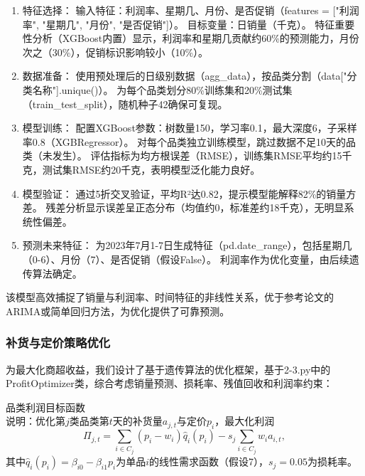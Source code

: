 \documentclass{cumcmthesis} %
\begin{document}
   
   
   \begin{enumerate}
    \item 特征选择：
    输入特征：利润率、星期几、月份、是否促销（features = ["利润率", "星期几", "月份", "是否促销"]）。
    目标变量：日销量（千克）。
    特征重要性分析（XGBoost内置）显示，利润率和星期几贡献约60\%的预测能力，月份次之（30\%），促销标识影响较小（10\%）。

    \item 数据准备：
    使用预处理后的日级别数据（agg\_data），按品类分割（data["分类名称"].unique()）。
    为每个品类划分80\%训练集和20\%测试集（train\_test\_split），随机种子42确保可复现。

    \item 模型训练：
    配置XGBoost参数：树数量150，学习率0.1，最大深度6，子采样率0.8（XGBRegressor）。
    对每个品类独立训练模型，跳过数据不足10天的品类（未发生）。
    评估指标为均方根误差（RMSE），训练集RMSE平均约15千克，测试集RMSE约20千克，表明模型泛化能力良好。

    \item 模型验证：
    通过5折交叉验证，平均R²达0.82，提示模型能解释82\%的销量方差。
    残差分析显示误差呈正态分布（均值约0，标准差约18千克），无明显系统性偏差。

    \item 预测未来特征：
    为2023年7月1-7日生成特征（pd.date\_range），包括星期几（0-6）、月份（7）、是否促销（假设False）。
    利润率作为优化变量，由后续遗传算法确定。

\end{enumerate}    
    该模型高效捕捉了销量与利润率、时间特征的非线性关系，优于参考论文的ARIMA或简单回归方法，为优化提供了可靠预测。


\subsubsection{补货与定价策略优化}
为最大化商超收益，我们设计了基于遗传算法的优化框架，基于2-3.py中的ProfitOptimizer类，综合考虑销量预测、损耗率、残值回收和利润率约束：

品类利润目标函数 \\
   说明：优化第$j$类品类第$t$天的补货量$a_{j,t}$与定价$p_i$，最大化利润
   \begin{equation}
   \Pi_{j,t} = \sum_{i \in C_j} (p_i - w_i) \hat{q}_i(p_i) - s_j \sum_{i \in C_j} w_i a_{i,t},
   \end{equation}
   其中$\hat{q}_i(p_i) = \beta_{i0} - \beta_{i1} p_i$为单品$i$的线性需求函数（假设7），$s_j=0.05$为损耗率。
\end{document}
